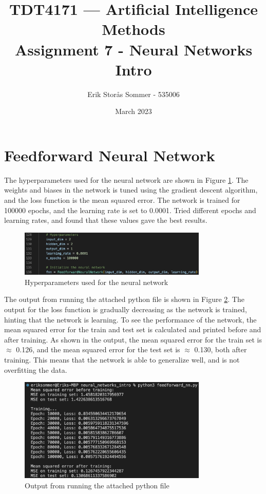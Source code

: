 \documentclass{article}
\title{TDT4171 — Artificial Intelligence Methods \\ Assignment 7 - Neural Networks Intro}
\author{Erik Storås Sommer - 535006}
\date{March 2023}
\begin{document}
\maketitle
\setlength{\parindent}{0pt}

\section*{Feedforward Neural Network}

The hyperparameters used for the neural network are shown in Figure \ref{fig:image1}.
The weights and biases in the network is tuned using the gradient descent algorithm, and the loss function is the mean squared error.
The network is trained for 100000 epochs, and the learning rate is set to 0.0001.
Tried different epochs and learning rates, and found that these values gave the best results.

\begin{figure}[hbtp]
    \centering
    \includegraphics[width=0.8\textwidth]{hyperparameters.png}
    \caption{Hyperparameters used for the neural network}
    \label{fig:image1}
\end{figure}

The output from running the attached python file is shown in Figure \ref{fig:image2}.
The output for the loss function is gradually decreasing as the network is trained, hinting that the network is learning.
To see the performance of the network, the mean squared error for the train and test set is calculated and printed before and after training.
As shown in the output, the mean squared error for the train set is $\approx$ 0.126, and the mean squared error for the test set is $\approx$ 0.130, both after training.
This means that the network is able to generalize well, and is not overfitting the data.

\begin{figure}[hbtp]
    \centering
    \includegraphics[width=0.8\textwidth]{output.png}
    \caption{Output from running the attached python file}
    \label{fig:image2}
\end{figure}
\end{document}
